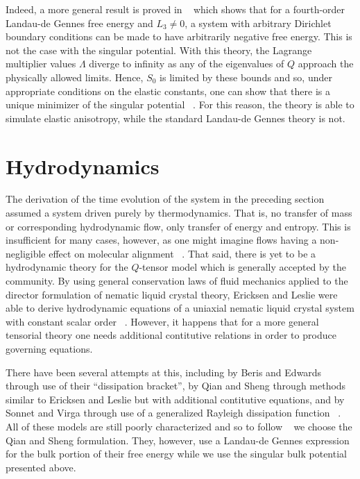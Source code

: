 \documentclass[reqno]{article}
\begin{document}
  Indeed, a more general result is proved in ~\cite{ball_nematic_2010} which
  shows that for a fourth-order Landau-de Gennes free energy and $L_3 \neq 0$, a system with
  arbitrary Dirichlet boundary conditions can be made to have arbitrarily
  negative free energy.
  This is not the case with the singular potential.
  With this theory, the Lagrange multiplier values $\Lambda$ diverge to
  infinity as any of the eigenvalues of $Q$ approach the physically allowed
  limits.
  Hence, $S_0$ is limited by these bounds and so, under appropriate conditions
  on the elastic constants, one can show that there is a unique minimizer of the
  singular potential ~\cite{schimming_numerical_2021}.
  For this reason, the theory is able to simulate elastic anisotropy, while the
  standard Landau-de Gennes theory is not.


  \section{Hydrodynamics}
  The derivation of the time evolution of the system in the preceding section
  assumed a system driven purely by thermodynamics.
  That is, no transfer of mass or corresponding hydrodynamic flow, only transfer of energy and entropy.
  This is insufficient for many cases, however, as one might imagine flows
  having a non-negligible effect on molecular alignment
  ~\cite{svensek_hydrodynamics_2002, toth_hydrodynamics_2002}.
  That said, there is yet to be a hydrodynamic theory for the $Q$-tensor model
  which is generally accepted by the community.
  By using general conservation laws of fluid mechanics applied to the director
  formulation of nematic liquid crystal theory, Ericksen and Leslie were able to
  derive hydrodynamic equations of a uniaxial nematic liquid crystal system with
  constant scalar order ~\cite{ericksen_hydrostatic_1962, Leslie1968}.
  However, it happens that for a more general tensorial theory one needs
  additional contitutive relations in order to produce governing equations.

  There have been several attempts at this, including by Beris and Edwards
  through use of their ``dissipation bracket'', by Qian and Sheng through
  methods similar to Ericksen and Leslie but with additional contitutive
  equations, and by Sonnet and Virga through use of a generalized Rayleigh
  dissipation function ~\cite{Beris1994, qian_generalized_1998, sonnet_dissipative_2012}.
  All of these models are still poorly characterized and so to follow
  ~\cite{svensek_hydrodynamics_2002} we choose the Qian and Sheng
  formulation.
  They, however, use a Landau-de Gennes expression for the bulk portion of their
  free energy while we use the singular bulk potential presented above.
\end{document}
